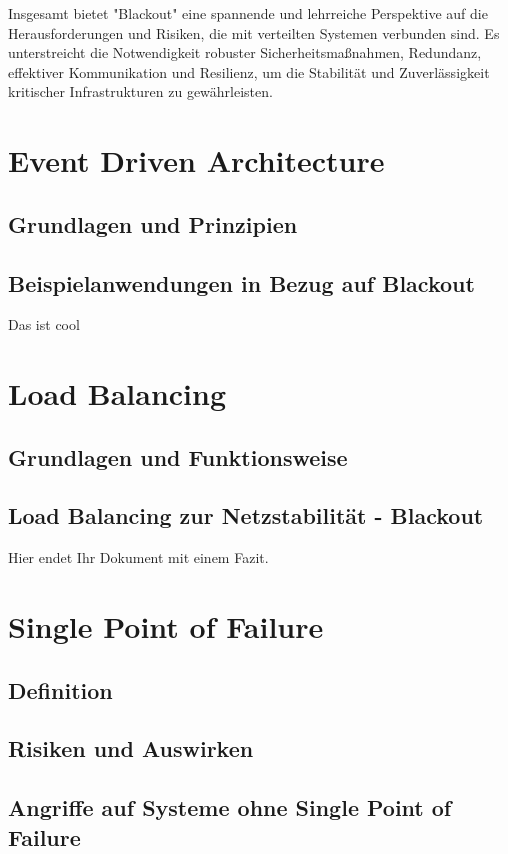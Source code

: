 \documentclass[a4paper,12pt]{article}
\let\stdsection\section
\renewcommand\section{\newpage\stdsection}
\begin{document}
Insgesamt bietet "Blackout" eine spannende und lehrreiche Perspektive auf die Herausforderungen und Risiken, die mit verteilten Systemen verbunden sind. Es unterstreicht die Notwendigkeit robuster Sicherheitsmaßnahmen, Redundanz, effektiver Kommunikation und Resilienz, um die Stabilität und Zuverlässigkeit kritischer Infrastrukturen zu gewährleisten.

\section{Event Driven Architecture}
\subsection{Grundlagen und Prinzipien}
\subsection{Beispielanwendungen in Bezug auf Blackout}
Das ist cool

\section{Load Balancing}
\subsection{Grundlagen und Funktionsweise}
\subsection{Load Balancing zur Netzstabilität - Blackout}
Hier endet Ihr Dokument mit einem Fazit.

\section{Single Point of Failure}
\subsection{Definition}
\subsection{Risiken und Auswirken}
\subsection{Angriffe auf Systeme ohne Single Point of Failure}
\end{document}
